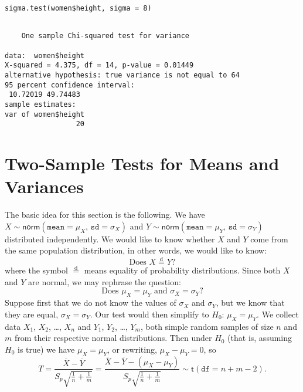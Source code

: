 \begin{verbatim}
sigma.test(women$height, sigma = 8)
\end{verbatim}

\begin{verbatim}

	One sample Chi-squared test for variance

data:  women$height
X-squared = 4.375, df = 14, p-value = 0.01449
alternative hypothesis: true variance is not equal to 64
95 percent confidence interval:
 10.72019 49.74483
sample estimates:
var of women$height 
                 20
\end{verbatim}

\section{Two-Sample Tests for Means and Variances}
\label{sec-10-4}

The basic idea for this section is the following. We have
\(X\sim\mathsf{norm}(\mathtt{mean} = \mu_{X},\,\mathtt{sd} =
\sigma_{X})\) and \(Y\sim\mathsf{norm}(\mathtt{mean} =
\mu_{Y},\,\mathtt{sd} = \sigma_{Y})\) distributed independently. We
would like to know whether \(X\) and \(Y\) come from the same
population distribution, in other words, we would like to know:
\begin{equation}
\mbox{Does }X\overset{\mathrm{d}}{=}Y?
\end{equation}
where the symbol \(\overset{\mathrm{d}}{=}\) means equality of
probability distributions.  Since both \(X\) and \(Y\) are normal, we
may rephrase the question:
\begin{equation}
\mbox{Does }\mu_{X} = \mu_{Y}\mbox{ and }\sigma_{X} = \sigma_{Y}?
\end{equation}
Suppose first that we do not know the values of \(\sigma_{X}\) and
\(\sigma_{Y}\), but we know that they are equal,
\(\sigma_{X}=\sigma_{Y}\). Our test would then simplify to
\(H_{0}:\,\mu_{X} = \mu_{Y}\). We collect data \(X_{1}\), \(X_{2}\),
\ldots{}, \(X_{n}\) and \(Y_{1}\), \(Y_{2}\), \ldots{}, \(Y_{m}\), both simple
random samples of size \(n\) and \(m\) from their respective normal
distributions. Then under \(H_{0}\) (that is, assuming \(H_{0}\) is
true) we have \(\mu_{X} = \mu_{Y}\), or rewriting, \(\mu_{X} - \mu_{Y}
= 0\), so
\begin{equation}
T = \frac{\overline{X} - \overline{Y}}{S_{p}\sqrt{\frac{1}{n} + \frac{1}{m}}} = \frac{\overline{X} - \overline{Y} - (\mu_{X} - \mu_{Y})}{S_{p}\sqrt{\frac{1}{n} + \frac{1}{m}}}\sim\mathsf{t}(\mathtt{df} = n + m - 2).
\end{equation}

